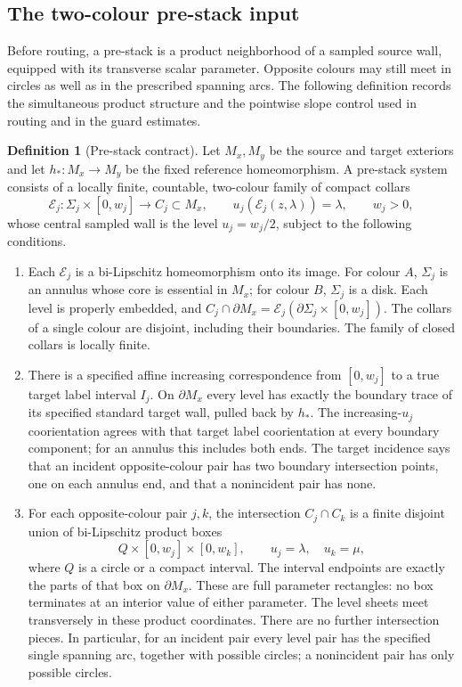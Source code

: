 \documentclass[11pt]{article}
\numberwithin{equation}{section}
\theoremstyle{definition}
\newtheorem{definition}[theorem]{Definition}
\theoremstyle{remark}
\begin{document}
\subsection{The two-colour pre-stack input}
\label{wl:prestack-subsection}

Before routing, a pre-stack is a product neighborhood of a sampled source
wall, equipped with its transverse scalar parameter.  Opposite colours may
still meet in circles as well as in the prescribed spanning arcs.  The
following definition records the simultaneous product structure and the
pointwise slope control used in routing and in the guard estimates.

\begin{definition}[Pre-stack contract]\label{wl:prestack}
Let $M_x,M_y$ be the source and target exteriors and let
$h_*:M_x\to M_y$ be the fixed reference homeomorphism.  A pre-stack
system consists of a locally finite, countable, two-colour family of
compact collars
\[
 \mathcal E_j:\Sigma_j\times[0,w_j]\longrightarrow C_j\subset M_x,
 \qquad u_j(\mathcal E_j(z,\lambda))=\lambda,\qquad w_j>0,
\]
whose central sampled wall is the level $u_j=w_j/2$, subject to the
following conditions.
\begin{enumerate}
\item Each $\mathcal E_j$ is a bi-Lipschitz homeomorphism onto its image.
For colour $A$, $\Sigma_j$ is an annulus whose core is essential in
$M_x$; for colour $B$, $\Sigma_j$ is a disk.
Each level is properly embedded, and
$C_j\cap\partial M_x=\mathcal E_j(\partial\Sigma_j\times[0,w_j])$.
The collars of a single colour are disjoint, including their boundaries.
The family of closed collars is locally finite.

\item There is a specified affine increasing correspondence from
$[0,w_j]$ to a true target label interval $I_j$.
On $\partial M_x$ every level has exactly the boundary trace of its
specified standard target wall, pulled back by $h_*$.
The increasing-$u_j$ coorientation agrees with that target label
coorientation at every boundary component; for an annulus this includes
both ends.  The target incidence says that an incident opposite-colour
pair has two boundary intersection points, one on each annulus end,
and that a nonincident pair has none.

\item For each opposite-colour pair $j,k$, the intersection
$C_j\cap C_k$ is a finite disjoint union of bi-Lipschitz product boxes
\[
 Q\times[0,w_j]\times[0,w_k],
 \qquad u_j=\lambda,\quad u_k=\mu,
\]
where $Q$ is a circle or a compact interval.  The interval endpoints
are exactly the parts of that box on $\partial M_x$.
These are full parameter rectangles: no box terminates at an interior
value of either parameter.  The level sheets meet transversely in
these product coordinates.  There are no further intersection pieces.
In particular, for an incident pair every level pair has the specified
single spanning arc, together with possible circles; a nonincident pair
has only possible circles.


\end{enumerate}
\end{definition}
\end{document}
